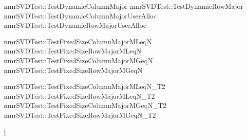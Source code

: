 \begin{DoxyRefList}
\item[\label{test__test000018}%
\hypertarget{test__test000018}{}%
Member \hyperlink{nmr_s_v_d_8h_a383789bfca3fc90017fa2e4373c0307f}{nmr\-S\-V\-D} (vct\-Dynamic\-Matrix\-Base$<$ \-\_\-matrix\-Owner\-Type, C\-I\-S\-S\-T\-N\-E\-T\-L\-I\-B\-\_\-\-D\-O\-U\-B\-L\-E $>$ \&A, \hyperlink{classnmr_s_v_d_dynamic_data}{nmr\-S\-V\-D\-Dynamic\-Data} \&data)]nmr\-S\-V\-D\-Test\-::\-Test\-Dynamic\-Column\-Major nmr\-S\-V\-D\-Test\-::\-Test\-Dynamic\-Row\-Major nmr\-S\-V\-D\-Test\-::\-Test\-Dynamic\-Column\-Major\-User\-Alloc nmr\-S\-V\-D\-Test\-::\-Test\-Dynamic\-Row\-Major\-User\-Alloc  
\item[\label{test__test000023}%
\hypertarget{test__test000023}{}%
Member \hyperlink{nmr_s_v_d_8h_a52115d0e7a485c4494aa20f4f3f4ebe7}{nmr\-S\-V\-D} (vct\-Fixed\-Size\-Matrix$<$ C\-I\-S\-S\-T\-N\-E\-T\-L\-I\-B\-\_\-\-D\-O\-U\-B\-L\-E, \-\_\-rows, \-\_\-cols, \-\_\-storage\-Order $>$ \&A, nmr\-S\-V\-D\-Fixed\-Size\-Data$<$ \-\_\-rows, \-\_\-cols, \-\_\-storage\-Order $>$ \&data)]nmr\-S\-V\-D\-Test\-::\-Test\-Fixed\-Size\-Column\-Major\-M\-Leq\-N nmr\-S\-V\-D\-Test\-::\-Test\-Fixed\-Size\-Row\-Major\-M\-Leq\-N nmr\-S\-V\-D\-Test\-::\-Test\-Fixed\-Size\-Column\-Major\-M\-Geq\-N nmr\-S\-V\-D\-Test\-::\-Test\-Fixed\-Size\-Row\-Major\-M\-Geq\-N  
\item[\label{test__test000021}%
\hypertarget{test__test000021}{}%
Member \hyperlink{nmr_s_v_d_8h_a2ce268a6a45975371d5a6dcaecf40831}{nmr\-S\-V\-D} (vct\-Fixed\-Size\-Matrix$<$ C\-I\-S\-S\-T\-N\-E\-T\-L\-I\-B\-\_\-\-D\-O\-U\-B\-L\-E, \-\_\-rows, \-\_\-cols, \-\_\-storage\-Order $>$ \&A, \hyperlink{classvct_fixed_size_matrix}{vct\-Fixed\-Size\-Matrix$<$ C\-I\-S\-S\-T\-N\-E\-T\-L\-I\-B\-\_\-\-D\-O\-U\-B\-L\-E, \-\_\-rows, \-\_\-rows, \-\_\-storage\-Order $>$} \&U, vct\-Fixed\-Size\-Vector$<$ C\-I\-S\-S\-T\-N\-E\-T\-L\-I\-B\-\_\-\-D\-O\-U\-B\-L\-E, \-\_\-minmn $>$ \&S, \hyperlink{classvct_fixed_size_matrix}{vct\-Fixed\-Size\-Matrix$<$ C\-I\-S\-S\-T\-N\-E\-T\-L\-I\-B\-\_\-\-D\-O\-U\-B\-L\-E, \-\_\-cols, \-\_\-cols, \-\_\-storage\-Order $>$} \&Vt, vct\-Fixed\-Size\-Vector$<$ C\-I\-S\-S\-T\-N\-E\-T\-L\-I\-B\-\_\-\-D\-O\-U\-B\-L\-E, \-\_\-work $>$ \&workspace)]nmr\-S\-V\-D\-Test\-::\-Test\-Fixed\-Size\-Column\-Major\-M\-Leq\-N\-\_\-\-T2 nmr\-S\-V\-D\-Test\-::\-Test\-Fixed\-Size\-Row\-Major\-M\-Leq\-N\-\_\-\-T2 nmr\-S\-V\-D\-Test\-::\-Test\-Fixed\-Size\-Column\-Major\-M\-Geq\-N\-\_\-\-T2 nmr\-S\-V\-D\-Test\-::\-Test\-Fixed\-Size\-Row\-Major\-M\-Geq\-N\-\_\-\-T2  
\item[\label{test__test000020}%
\hypertarget{test__test000020}{}%

\end{DoxyRefList}
